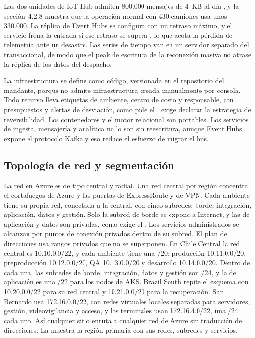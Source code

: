 Las dos unidades de IoT Hub admiten 800.000 mensajes de 4~KB al día \parencite{ms_iothub_cuotas}, y la
sección~4.2.8 muestra que la operación normal con 430 camiones usa unos 330.000. La réplica de Event
Hubs se configura con un retraso máximo, y el servicio frena la entrada si ese retraso se supera
\parencite{ms_eh_georep}, lo que acota la pérdida de telemetría ante un desastre. Las series de tiempo
van en un servidor separado del transaccional, de modo que el peak de escritura de la reconexión masiva
no atrase la réplica de los datos del despacho.


La infraestructura se define como código, versionada en el repositorio del mandante, porque
 no admite infraestructura creada manualmente por consola. Todo recurso lleva
etiquetas de ambiente, centro de costo y responsable, con presupuestos y alertas de desviación, como
pide el .  exige declarar la estrategia de reversibilidad. Los
contenedores y el motor relacional son portables. Los servicios de ingesta, mensajería y analítica no lo
son sin reescritura, aunque Event Hubs expone el protocolo Kafka y eso reduce el esfuerzo de migrar el
bus.

\subsection{Topología de red y segmentación}\label{sec:4-red}

La red en Azure es de tipo central y radial. Una red central por región concentra el cortafuegos de
Azure y las puertas de ExpressRoute y de VPN. Cada ambiente tiene su propia red, conectada a la
central, con cinco subredes: borde, integración, aplicación, datos y gestión. Solo la subred de borde se
expone a Internet, y las de aplicación y datos son privadas, como exige el . Los servicios
administrados se alcanzan por puntos de conexión privados dentro de su subred. El plan de direcciones usa rangos privados que no se
superponen. En Chile Central la red central es 10.10.0.0/22, y cada ambiente tiene una /20: producción
10.11.0.0/20, preproducción 10.12.0.0/20, QA 10.13.0.0/20 y desarrollo 10.14.0.0/20. Dentro de cada
una, las subredes de borde, integración, datos y gestión son /24, y la de aplicación es una /22 para
los nodos de AKS. Brazil South repite el esquema con 10.20.0.0/22 para su red central y 10.21.0.0/20
para la recuperación. San Bernardo usa 172.16.0.0/22, con redes virtuales locales separadas para
servidores, gestión, videovigilancia y acceso, y los terminales usan 172.16.4.0/22, una /24 cada uno.
Así cualquier sitio enruta a cualquier red de Azure sin traducción de direcciones. La  muestra la región primaria con sus redes, subredes y
servicios.

